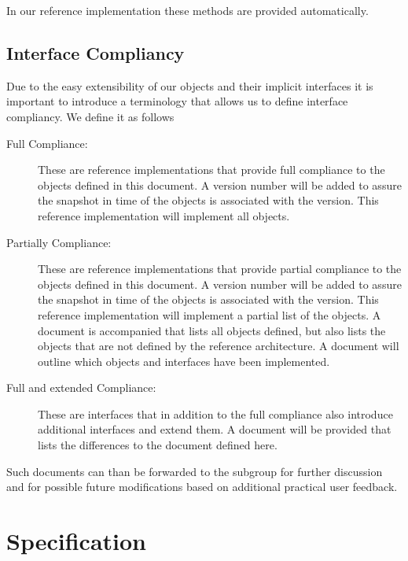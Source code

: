 \documentclass[10pt]{article}
\begin{document}
In our reference implementation these methods are provided
automatically.

\subsection{Interface Compliancy}

Due to the easy extensibility of our objects and their implicit
interfaces it is important to introduce a terminology that allows us
to define interface compliancy. We define it as follows

\begin{description}

\item[Full Compliance:] These are reference implementations that
  provide full compliance to the objects defined in this document. A
  version number will be added to assure the snapshot in time of the
  objects is associated with the version. This reference
  implementation will implement all objects.

\item[Partially Compliance:] These are reference implementations that
  provide partial compliance to the objects defined in this
  document. A version number will be added to assure the snapshot in
  time of the objects is associated with the version. This reference
  implementation will implement a partial list of the objects. A
  document is accompanied that lists all objects defined, but also
  lists the objects that are not defined by the reference
  architecture. A document will outline which objects and interfaces
  have been implemented.

\item[Full and extended Compliance:] These are interfaces that in
  addition to the full compliance also introduce additional interfaces
  and extend them. A document will be provided that lists the
  differences to the document defined here.

\end{description}

Such documents can than be forwarded to the subgroup for further
discussion and for possible future modifications based on additional
practical user feedback.



\section{Specification}
\end{document}

